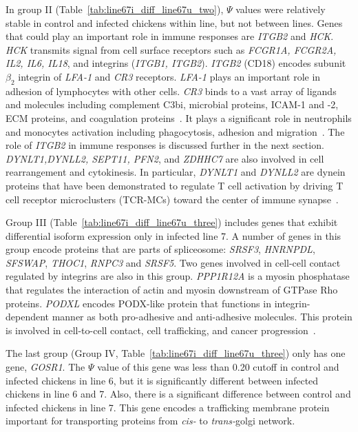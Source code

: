 \documentclass[10pt]{article}
\begin{document}
In group II (Table~\ref{tab:line67i_diff_line67u_two}),
 $\Psi$ values were relatively stable in control and infected chickens within line, but not between lines.
Genes that could play an important role in immune responses are \textit{ITGB2} and \textit{HCK}.
\textit{HCK} transmits signal from cell surface receptors such as \textit{FCGR1A, FCGR2A, IL2, IL6,
IL18}, and integrins (\textit{ITGB1, ITGB2}).
\textit{ITGB2} (CD18) encodes subunit $\beta_{2}$ integrin of \textit{LFA-1} and \textit{CR3} receptors.
\textit{LFA-1} plays an important role in adhesion of lymphocytes with other cells.
\textit{CR3} binds to a vast array of ligands and molecules including complement C3bi, microbial proteins,
ICAM-1 and -2, ECM proteins, and coagulation proteins~\cite{}.
It plays a significant role in neutrophils and monocytes activation including phagocytosis, adhesion and
migration~\cite{}.
The role of \textit{ITGB2} in immune responses is discussed further in the next section.
\textit{DYNLT1,DYNLL2, SEPT11, PFN2}, and \textit{ZDHHC7} are also involved in cell
rearrangement and cytokinesis.
In particular, \textit{DYNLT1} and \textit{DYNLL2} are dynein proteins that have been demonstrated to
regulate T cell activation by driving T cell receptor microclusters (TCR-MCs)
toward the center of immune synapse~\cite{hashimoto2011dynein}.

Group III (Table~\ref{tab:line67i_diff_line67u_three})
includes genes that exhibit differential isoform expression only in infected line 7.
A number of genes in this group encode proteins that are parts of
spliceosome: \textit{SRSF3}, \textit{HNRNPDL},
\textit{SFSWAP}, \textit{THOC1}, \textit{RNPC3} and \textit{SRSF5}.
Two genes involved in cell-cell contact regulated by integrins are also in this group.
\textit{PPP1R12A} is a myosin phosphatase that regulates the interaction of actin
and myosin downstream of GTPase Rho proteins.
\textit{PODXL} encodes PODX-like protein that functions in integrin-dependent
manner as both pro-adhesive and anti-adhesive molecules.
This protein is involved in cell-to-cell contact, cell trafficking, and cancer progression~\cite{}.

The last group (Group IV, Table~\ref{tab:line67i_diff_line67u_three})
only has one gene, \textit{GOSR1}.
The $\Psi$ value of this gene was less than 0.20 cutoff in control and infected chickens in line 6, but it is
significantly different between infected chickens in line 6 and 7.
Also, there is a significant difference between control and infected chickens in line 7.
This gene encodes a trafficking membrane protein important for transporting proteins
from \textit{cis-} to \textit{trans-}golgi network.
\end{document}
